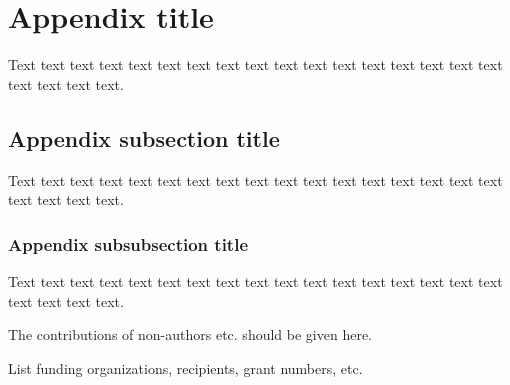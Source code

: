 \documentclass{iucrjournals}
\begin{document}
     
\appendix %
\section{Appendix title}

Text text text text text text text text text text text text text text
text text text text text text text.

\subsection{Appendix subsection title}

Text text text text text text text text text text text text text text
text text text text text text text.

\subsubsection{Appendix subsubsection title}

Text text text text text text text text text text text text text text
text text text text text text text.


\begin{acknowledgements}
The contributions of non-authors etc. should be given here.
\end{acknowledgements}

\begin{funding}
List funding organizations, recipients, grant numbers, etc.
\end{funding}




\end{document}
